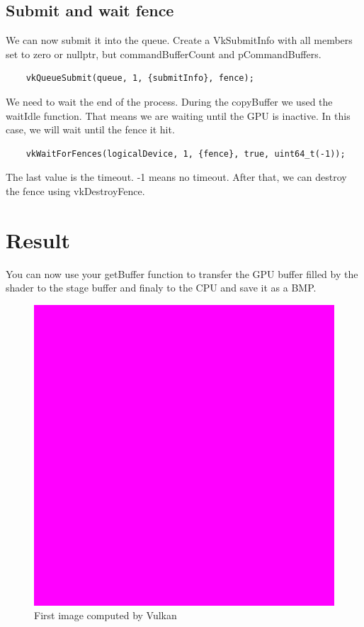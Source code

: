 \documentclass{article}
\begin{document}
\subsection{Submit and wait fence}
We can now submit it into the queue. Create a VkSubmitInfo with all members set to zero or nullptr, but commandBufferCount and pCommandBuffers.
\begin{lstlisting}
	vkQueueSubmit(queue, 1, {submitInfo}, fence);
\end{lstlisting}
We need to wait the end of the process. During the copyBuffer we used the waitIdle function. That means we are waiting until the GPU is inactive. In this case, we will wait until the fence it hit.
\begin{lstlisting}
	vkWaitForFences(logicalDevice, 1, {fence}, true, uint64_t(-1));
\end{lstlisting}
The last value is the timeout. -1 means no timeout.
After that, we can destroy the fence using vkDestroyFence.

\section{Result}
You can now use your getBuffer function to transfer the GPU buffer filled by the shader to the stage buffer and finaly to the CPU and save it as a BMP.
\begin{figure}[h]
	\centering
	\includegraphics[scale=1]{figures/result.png}
	\caption{First image computed by Vulkan}
\end{figure}
\end{document}
